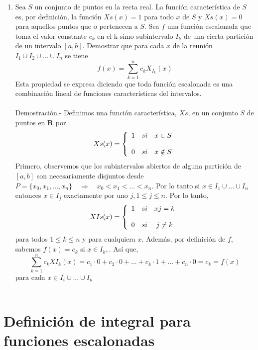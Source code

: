 \begin{enumerate}
    \item Sea $S$ un conjunto de puntos en la recta real. La función característica de $S$ es, por definición, la función $Xs(x)=1$ para todo $x$ de $S$ y $Xs(x)=0$ para aquellos puntos que o pertenecen a $S$. Sea $f$ una función escalonada que toma el valor constante $c_k$ en el k-simo subintervalo $I_k$ de una cierta partición de un intervalo $[a,b]$. Demostrar que para cada $x$ de la reunión $I_1 \cup I_2 \cup ... \cup I_n$ se tiene $$f(x)=\sum\limits_{k=1}^{n} c_k X_{I_k} (x)$$ Esta propiedad se expresa diciendo que toda función escalonada es una combinación lineal de funciones características del intervalos.\\\\
	Demostración.-\; Definimos una función característica, $Xs$, en un conjunto $S$ de puntos en $\mathbf{R}$ por 
	$$Xs(x)=\left\{\begin{array}{c c c} 
	    1&si&x\in S\\ 
	    \\0&si&x \notin S \\
	\end{array}\right.$$
	Primero, observemos que los subintervalos abiertos de alguna partición de $[a,b]$ son necesariamente disjuntos desde $P=\lbrace x_0,x_1,...,x_n \rbrace \quad \Longrightarrow \quad x_0<x_1<...<x_n$. Por lo tanto si $x\in I_1 \cup ... \cup I_n$ entonces $x \in I_j$ exactamente por uno $j, 1\leq j \leq n$. Por lo tanto,
	$$XIs(x)=\left\{\begin{array}{c c c} 
	    1&si&xj=k\\ 
	    \\0&si&j\neq k \\
	\end{array}\right.$$
	para todos $1\leq k\leq n$ y para cualquiera $x$. Además, por definición de $f$, sabemos $f(x)=c_k$ si $x\in I_k,$. Así que, 
	$$\sum\limits_{k=1}^{n} c_k XI_k(x) = c_1\cdot 0 + c_2 \cdot 0 + ... + c_k\cdot 1 + ... + c_n\cdot 0 = c_k = f(x)$$
	para cada $x\in I_i \cup ... \cup I_n$\\\\

    \end{enumerate}
   
\section{Definición de integral para funciones escalonadas}

